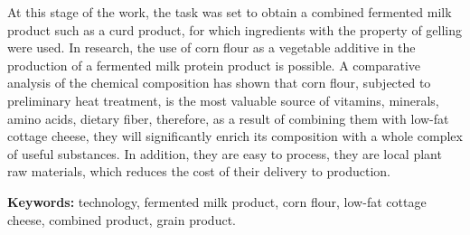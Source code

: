 At this stage of the work, the task was set to obtain a combined
fermented milk product such as a curd product, for which ingredients
with the property of gelling were used. In research, the use of corn
flour as a vegetable additive in the production of a fermented milk
protein product is possible. A comparative analysis of the chemical
composition has shown that corn flour, subjected to preliminary heat
treatment, is the most valuable source of vitamins, minerals, amino
acids, dietary fiber, therefore, as a result of combining them with
low-fat cottage cheese, they will significantly enrich its composition
with a whole complex of useful substances. In addition, they are easy to
process, they are local plant raw materials, which reduces the cost of
their delivery to production.

{\bfseries Keywords:} technology, fermented milk product, corn flour,
low-fat cottage cheese, combined product, grain product.

